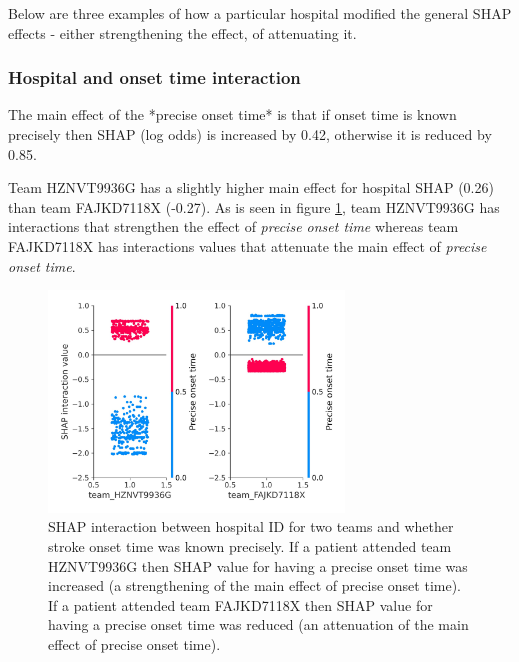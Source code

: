Below are three examples of how a particular hospital modified the general SHAP effects - either strengthening the effect, of attenuating it.


\subsubsection{Hospital and onset time interaction}

The main effect of the *precise onset time* is that if onset time is known precisely then SHAP (log odds) is increased by 0.42, otherwise it is reduced by 0.85.

Team HZNVT9936G has a slightly higher main effect for hospital SHAP (0.26) than team FAJKD7118X (-0.27). As is seen in figure \ref{fig:interaction_precise}, team HZNVT9936G has interactions that strengthen the effect of \emph{precise onset time} whereas team FAJKD7118X has interactions values that attenuate the main effect of \emph{precise onset time}.

\begin{figure}
\centering
\includegraphics[width=0.7\textwidth]{./images/12aa_onset_time_type_interaction_example}
\caption{SHAP interaction between hospital ID for two teams and whether stroke onset time was known precisely. If a patient attended team HZNVT9936G then SHAP value for having a precise onset time was increased (a strengthening of the main effect of precise onset time). If a patient attended team FAJKD7118X then SHAP value for having a precise onset time was reduced (an attenuation of the main effect of precise onset time).}
\label{fig:interaction_precise}
\end{figure}


